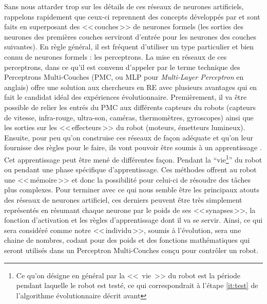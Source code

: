 Sans nous attarder trop sur les détails de ces réseaux de neurones artificiels, rappelons rapidement que ceux-ci reprennent des concepts développés par \citep{mcculloch1943alogicalcideaimmanervacti} et sont faits en superposant des <<\,couches\,>> de neurones formels (les sorties des neurones des premières couches serviront d'entrée pour les neurones des couches suivantes). En règle général, il est fréquent d'utiliser un type particulier et bien connu de neurones formels : les perceptrons. La mise en réseaux de ces perceptrons, dans ce qu'il est convenu d'appeler par le terme technique des Perceptrons Multi-Couches (PMC, ou MLP pour \emph{Multi-Layer Perceptron} en anglais) offre une solution aux chercheurs en RE avec plusieurs avantages qui en fait le candidat idéal des expériences évolutionnaire. Premièrement, il va être possible de relier les entrés du PMC aux différents capteurs du robots (capteurs de vitesse, infra-rouge, ultra-son, caméras, thermomètres, gyroscopes) ainsi que les sorties sur les <<\,effecteurs\,>> du robot (moteurs, émetteurs lumineux). Ensuite, pour peu qu'on construise ces réseaux de façon adéquate et qu'on leur fournisse des règles pour le faire, ils vont pouvoir être soumis à un apprentissage \citep[p. 30-39]{nolfi00evolrobobiolintetechselfmach}. Cet apprentissage peut être mené de différentes façon. Pendant la ``vie\footnote{Ce qu'on désigne en général par la <<~vie~>> du robot est la période pendant laquelle le robot est testé, ce qui correspondrait à l'étape \ref{it:test} de l'algorithme évolutionnaire décrit avant}'' du robot ou pendant une phase spécifique d'apprentissage. Ces méthodes offrent au robot une <<\,mémoire\,>> et donc la possibilité pour celui-ci de résoudre des tâches plus complexes. Pour terminer avec ce qui nous semble être les principaux atouts des réseaux de neurones artificiel, ces derniers peuvent être très simplement représentés en résumant chaque neurone par le poids de ses <<\,synapses\,>>, la fonction d'activation et les règles d'apprentissage dont il va se servir. Ainsi, ce qui sera considéré comme notre <<\,individu\,>>, soumis à l'évolution, sera une chaine de nombres, codant pour des poids et des fonctions mathématiques qui seront utilisés dans un Perceptron Multi-Couches conçu pour contrôler un robot.

